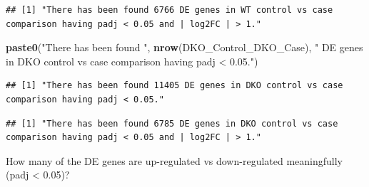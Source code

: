 \documentclass[
]{article}
\newenvironment{Shaded}{\begin{snugshade}}{\end{snugshade}}
\newcommand{\DecValTok}[1]{\textcolor[rgb]{0.00,0.00,0.81}{#1}}
\newcommand{\FunctionTok}[1]{\textcolor[rgb]{0.13,0.29,0.53}{\textbf{#1}}}
\newcommand{\NormalTok}[1]{#1}
\newcommand{\SpecialCharTok}[1]{\textcolor[rgb]{0.81,0.36,0.00}{\textbf{#1}}}
\newcommand{\StringTok}[1]{\textcolor[rgb]{0.31,0.60,0.02}{#1}}
\begin{document}
\begin{verbatim}
## [1] "There has been found 6766 DE genes in WT control vs case comparison having padj < 0.05 and | log2FC | > 1."
\end{verbatim}

\begin{Shaded}
\begin{Highlighting}[]
\FunctionTok{paste0}\NormalTok{(}\StringTok{"There has been found "}\NormalTok{, }\FunctionTok{nrow}\NormalTok{(DKO\_Control\_DKO\_Case), }\StringTok{" DE genes in DKO control vs case comparison having padj \textless{} 0.05."}\NormalTok{)}
\end{Highlighting}
\end{Shaded}

\begin{verbatim}
## [1] "There has been found 11405 DE genes in DKO control vs case comparison having padj < 0.05."
\end{verbatim}

\begin{Shaded}
\end{Shaded}

\begin{verbatim}
## [1] "There has been found 6785 DE genes in DKO control vs case comparison having padj < 0.05 and | log2FC | > 1."
\end{verbatim}

How many of the DE genes are up-regulated vs down-regulated meaningfully
(padj \textless{} 0.05)?

\begin{Shaded}
\end{Shaded}
\end{document}
